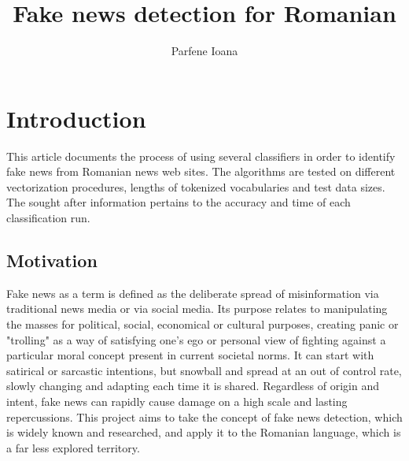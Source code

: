 \documentclass{article}
\author{Parfene Ioana}
\title{\textbf{Fake news detection for Romanian}}
\begin{document}
	\maketitle
	
	\section{Introduction}
	\par This article documents the process of using several classifiers in order to identify fake news from Romanian news web sites. The algorithms are tested on different vectorization procedures, lengths of tokenized vocabularies and test data sizes. The sought after information pertains to the accuracy and time of each classification run.
	\subsection{Motivation}	
	Fake news as a term is defined as the deliberate spread of misinformation via traditional news media or via social media. Its purpose relates to manipulating the masses for political, social, economical or cultural purposes, creating panic or "trolling" as a way of satisfying one's ego or personal view of fighting against a particular moral concept present in current societal norms. It can start with satirical or sarcastic intentions, but snowball and spread at an out of control rate, slowly changing and adapting each time it is shared. Regardless of origin and intent, fake news can rapidly cause damage on a high scale and lasting repercussions. This project aims to take the concept of fake news detection, which is widely known and researched, and apply it to the Romanian language, which is a far less explored territory. 
	
\end{document}
